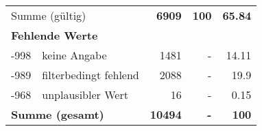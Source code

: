 \begin{longtable}{lXrrr}
     \midrule
     \multicolumn{2}{l}{Summe (gültig)} &
       \textbf{\num{6909}} &
     \textbf{100} &
       \textbf{\num[round-mode=places,round-precision=2]{65,84}} \\
     \multicolumn{5}{l}{\textbf{Fehlende Werte}}\\
       -998 &
       keine Angabe &
         \num{1481} &
        - &
         \num[round-mode=places,round-precision=2]{14,11} \\
       -989 &
       filterbedingt fehlend &
         \num{2088} &
        - &
         \num[round-mode=places,round-precision=2]{19,9} \\
       -968 &
       unplausibler Wert &
         \num{16} &
        - &
         \num[round-mode=places,round-precision=2]{0,15} \\
     \midrule
     \multicolumn{2}{l}{\textbf{Summe (gesamt)}} &
          \textbf{\num{10494}} &
        \textbf{-} &
        \textbf{100} \\
     \bottomrule
     \end{longtable}
     
